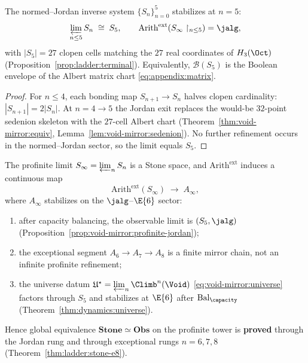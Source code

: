 \begin{proposition}\label{prop:void-mirror:profinite-jordan}
The normed--Jordan inverse system $\{S_n\}_{n=0}^{5}$ stabilizes at $n=5$:
\[
  \varprojlim_{n\leq5} S_n\;\cong\;S_5,
  \qquad
  \mathrm{Arith}^{\mathrm{ext}}(S_\infty\restriction_{n\leq5})=\jalg,
\]
with $|S_5|=27$ clopen cells matching the $27$ real coordinates of
$H_3(\Oct)$ (Proposition~\ref{prop:ladder:terminal}). Equivalently,
$\mathcal{B}(S_5)$ is the Boolean envelope of the Albert matrix chart
\eqref{eq:appendix:matrix}.
\end{proposition}

\begin{proof}
For $n\leq4$, each bonding map $S_{n+1}\to S_n$ halves clopen cardinality:
$|S_{n+1}|=2|S_n|$. At $n=4\to5$ the Jordan exit replaces the would-be
$32$-point sedenion skeleton with the $27$-cell Albert chart
(Theorem~\ref{thm:void-mirror:equiv}, Lemma~\ref{lem:void-mirror:sedenion}).
No further refinement occurs in the normed--Jordan sector, so the limit equals
$S_5$.
\end{proof}

\begin{proposition}\label{prop:void-mirror:profinite-func}
The profinite limit $S_\infty=\varprojlim_n S_n$ is a Stone space, and
$\mathrm{Arith}^{\mathrm{ext}}$ induces a continuous map
\[
  \mathrm{Arith}^{\mathrm{ext}}(S_\infty)\;\longrightarrow\;A_\infty,
\]
where $A_\infty$ stabilizes on the $\jalg$--$\E{6}$ sector:
\begin{enumerate}[label=(\roman*),leftmargin=*]
  \item after capacity balancing, the observable limit is
    $(S_5,\jalg)$ (Proposition~\ref{prop:void-mirror:profinite-jordan});
  \item the exceptional segment $A_6\to A_7\to A_8$ is a finite mirror chain,
    not an infinite profinite refinement;
  \item the universe datum $\mathfrak{U}^\star=\varprojlim_n\Climb^n(\Void)$
    \eqref{eq:void-mirror:universe} factors through $S_5$ and stabilizes at
    $\E{6}$ after $\mathrm{Bal}_\capacity$
    (Theorem~\ref{thm:dynamics:universe}).
\end{enumerate}
Hence global equivalence $\mathbf{Stone}\simeq\mathbf{Obs}$ on the profinite
tower is \textbf{proved} through the Jordan rung and through exceptional rungs
$n=6,7,8$ (Theorem~\ref{thm:ladder:stone-e8}).
\end{proposition}

